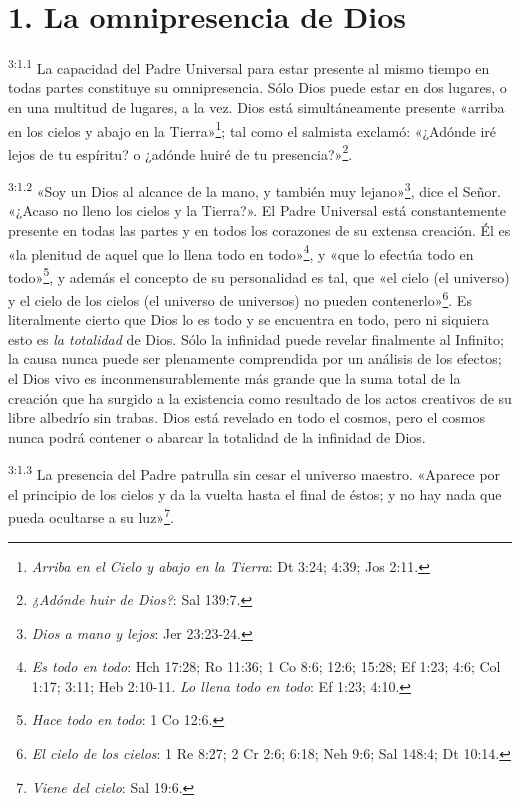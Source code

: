\section*{1. La omnipresencia de Dios}
\par
\textsuperscript{3:1.1} La capacidad del Padre Universal para estar presente al mismo tiempo en todas partes constituye su omnipresencia. Sólo Dios puede estar en dos lugares, o en una multitud de lugares, a la vez. Dios está simultáneamente presente «arriba en los cielos y abajo en la Tierra»\footnote{\textit{Arriba en el Cielo y abajo en la Tierra}: Dt 3:24; 4:39; Jos 2:11.}; tal como el salmista exclamó: «¿Adónde iré lejos de tu espíritu? o ¿adónde huiré de tu presencia?»\footnote{\textit{¿Adónde huir de Dios?}: Sal 139:7.}.

\par
\textsuperscript{3:1.2} «Soy un Dios al alcance de la mano, y también muy lejano»\footnote{\textit{Dios a mano y lejos}: Jer 23:23-24.}, dice el Señor. «¿Acaso no lleno los cielos y la Tierra?». El Padre Universal está constantemente presente en todas las partes y en todos los corazones de su extensa creación. Él es «la plenitud de aquel que lo llena todo en todo»\footnote{\textit{Es todo en todo}: Hch 17:28; Ro 11:36; 1 Co 8:6; 12:6; 15:28; Ef 1:23; 4:6; Col 1:17; 3:11; Heb 2:10-11. \textit{Lo llena todo en todo}: Ef 1:23; 4:10.}, y «que lo efectúa todo en todo»\footnote{\textit{Hace todo en todo}: 1 Co 12:6.}, y además el concepto de su personalidad es tal, que «el cielo (el universo) y el cielo de los cielos (el universo de universos) no pueden contenerlo»\footnote{\textit{El cielo de los cielos}: 1 Re 8:27; 2 Cr 2:6; 6:18; Neh 9:6; Sal 148:4; Dt 10:14.}. Es literalmente cierto que Dios lo es todo y se encuentra en todo, pero ni siquiera esto es \textit{la totalidad} de Dios. Sólo la infinidad puede revelar finalmente al Infinito; la causa nunca puede ser plenamente comprendida por un análisis de los efectos; el Dios vivo es inconmensurablemente más grande que la suma total de la creación que ha surgido a la existencia como resultado de los actos creativos de su libre albedrío sin trabas. Dios está revelado en todo el cosmos, pero el cosmos nunca podrá contener o abarcar la totalidad de la infinidad de Dios.

\par
\textsuperscript{3:1.3} La presencia del Padre patrulla sin cesar el universo maestro. «Aparece por el principio de los cielos y da la vuelta hasta el final de éstos; y no hay nada que pueda ocultarse a su luz»\footnote{\textit{Viene del cielo}: Sal 19:6.}.

